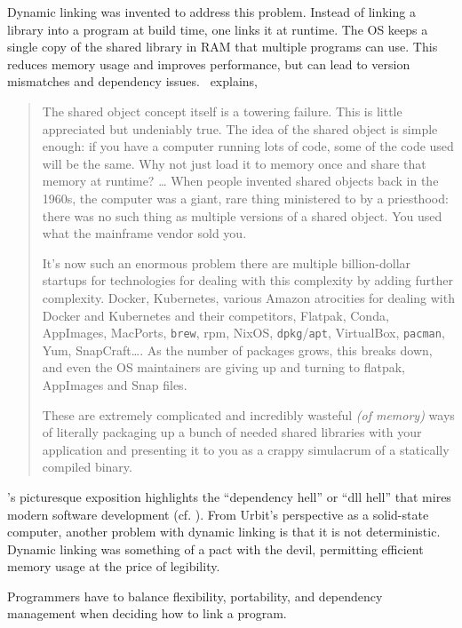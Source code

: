 \documentclass[twoside]{article}
\begin{document}
Dynamic linking was invented to address this problem.  Instead of linking a library into a program at build time, one links it at runtime.  The OS keeps a single copy of the shared library in RAM that multiple programs can use.  This reduces memory usage and improves performance, but can lead to version mismatches and dependency issues.  \citeauthor{Locklin2022}~explains,

\begin{quote}
The shared object concept itself is a towering failure. This is little appreciated but undeniably true. The idea of the shared object is simple enough: if you have a computer running lots of code, some of the code used will be the same. Why not just load it to memory once and share that memory at runtime? … When people invented shared objects back in the 1960s, the computer was a giant, rare thing ministered to by a priesthood: there was no such thing as multiple versions of a shared object. You used what the mainframe vendor sold you.

\sloppy
It's now such an enormous problem there are multiple billion-dollar startups for technologies for dealing with this complexity by adding further complexity. Docker, Kubernetes, various Amazon atrocities for dealing with Docker and Kubernetes and their competitors, Flatpak, Conda, AppImages, MacPorts, \texttt{brew}, {\sc rpm}, NixOS, \texttt{dpkg}/\texttt{apt}, VirtualBox, \texttt{pacman}, Yum, SnapCraft…. As the number of packages grows, this breaks down, and even the OS maintainers are giving up and turning to flatpak, AppImages and Snap files.

\sloppy
These are extremely complicated and incredibly wasteful \emph{(of memory)} ways of literally packaging up a bunch of needed shared libraries with your application and presenting it to you as a crappy simulacrum of a statically compiled binary.  \citep{Locklin2022}
\end{quote}

\noindent
\citeauthor{Locklin2022}'s picturesque exposition highlights the “dependency hell” or “{\sc dll} hell” that mires modern software development (cf. \citet{Grimes2003}).  From Urbit's perspective as a solid-state computer, another problem with dynamic linking is that it is not deterministic.  Dynamic linking was something of a pact with the devil, permitting efficient memory usage at the price of legibility.

Programmers have to balance flexibility, portability, and dependency management when deciding how to link a program.
\end{document}
